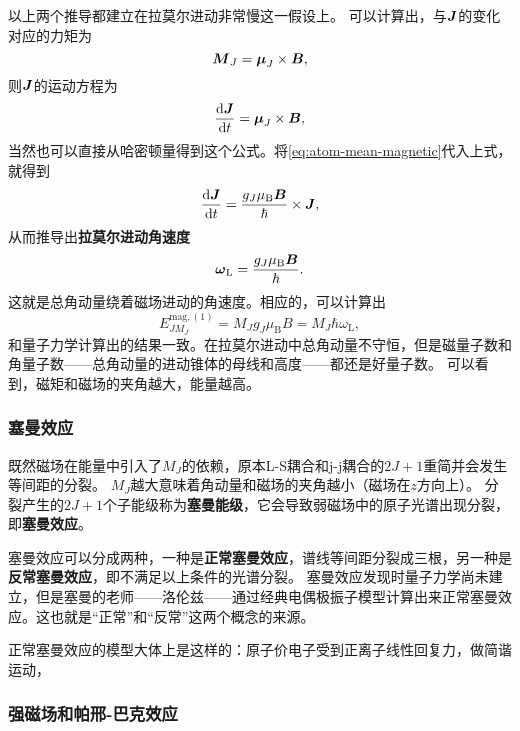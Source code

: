 \documentclass[UTF8, a4paper]{ctexart}
\begin{document}
以上两个推导都建立在拉莫尔进动非常慢这一假设上。
可以计算出，与$\vb*{J}$的变化对应的力矩为
\[
    \vb*{M}_J = \vb*{\mu}_J \times \vb*{B},
\]
则$\vb*{J}$的运动方程为
\[
    \dv{\vb*{J}}{t} = \vb*{\mu}_J \times \vb*{B},
\]
当然也可以直接从哈密顿量得到这个公式。将\eqref{eq:atom-mean-magnetic}代入上式，就得到
\[
    \dv{\vb*{J}}{t} = \frac{g_J \mu_\text{B} \vb*{B}}{\hbar} \times \vb*{J},
\]
从而推导出\textbf{拉莫尔进动角速度}
\begin{equation}
    \vb*{\omega}_\text{L} = \frac{g_J \mu_\text{B} \vb*{B}}{\hbar}.
\end{equation}
这就是总角动量绕着磁场进动的角速度。相应的，可以计算出 %
\begin{equation}
    E^{\text{mag}, (1)}_{JM_J} = M_J g_J \mu_\text{B} B = M_J \hbar \omega_\text{L},
    \label{eq:small-magnetic-gapping}
\end{equation}
和量子力学计算出的结果一致。在拉莫尔进动中总角动量不守恒，但是磁量子数和角量子数——总角动量的进动锥体的母线和高度——都还是好量子数。
可以看到，磁矩和磁场的夹角越大，能量越高。

\subsubsection{塞曼效应}

既然磁场在能量中引入了$M_J$的依赖，原本L-S耦合和j-j耦合的$2J+1$重简并会发生等间距的分裂。
$M_J$越大意味着角动量和磁场的夹角越小（磁场在$z$方向上）。
分裂产生的$2J+1$个子能级称为\textbf{塞曼能级}，它会导致弱磁场中的原子光谱出现分裂，即\textbf{塞曼效应}。

塞曼效应可以分成两种，一种是\textbf{正常塞曼效应}，谱线等间距分裂成三根，另一种是\textbf{反常塞曼效应}，即不满足以上条件的光谱分裂。
塞曼效应发现时量子力学尚未建立，但是塞曼的老师——洛伦兹——通过经典电偶极振子模型计算出来正常塞曼效应。这也就是“正常”和“反常”这两个概念的来源。

正常塞曼效应的模型大体上是这样的：原子价电子受到正离子线性回复力，做简谐运动，

\subsubsection{强磁场和帕邢-巴克效应}
\end{document}
